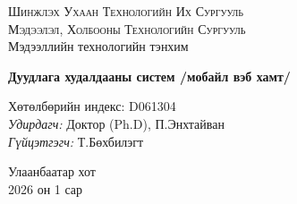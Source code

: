 \documentclass[12pt, a4paper]{report}
\newcommand{\thesistitle}{Дуудлага худалдааны систем /мобайл вэб хамт/}
\newcommand{\authorshort}{Т.Бөхбилэгт}
\newcommand{\supervisor}{Доктор (Ph.D), П.Энхтайван}
\newcommand{\universityname}{Шинжлэх Ухаан Технологийн Их Сургууль}
\newcommand{\facultyname}{Мэдээлэл, Холбооны Технологийн Сургууль}
\newcommand{\deptname}{Мэдээллийн технологийн тэнхим}
\newcommand{\degreeid}{D061304}
\begin{document}
\begin{titlepage}
\begin{center}

{\scshape\LARGE \universityname}\\[0.3cm]
{\scshape\Large \facultyname}\\[0.5cm]

\vspace{1.5cm}
\hfill{\large \deptname}

\vspace{1.5cm}
{\huge\bfseries \thesistitle}

\vspace{1.5cm}

\begin{minipage}[t]{0.9\textwidth}
\begin{flushleft}
\normalsize
Хөтөлбөрийн индекс: \degreeid \\

\emph{Удирдагч:} \supervisor \\
\emph{Гүйцэтгэгч:} \authorshort \\
\end{flushleft}
\end{minipage}

\vfill
{\large Улаанбаатар хот} \\
{\large 2026 он 1 сар}

\end{center}
\end{titlepage}
\end{document}
